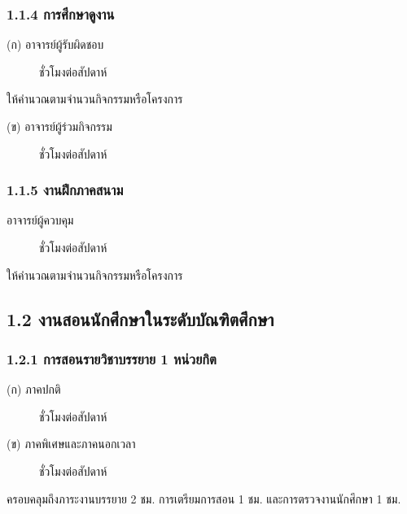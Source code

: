 \documentclass[a4paper,12pt,english]{sphinxmanual}
\begin{document}
\subsubsection{1.1.4 การศึกษาดูงาน}
\label{\detokenize{workload_rubric:id7}}\begin{description}
\item[{(ก) อาจารย์ผู้รับผิดชอบ}]  ชั่วโมงต่อสัปดาห์

\end{description}

ให้คำนวณตามจำนวนกิจกรรมหรือโครงการ
\begin{description}
\item[{(ข) อาจารย์ผู้ร่วมกิจกรรม}]  ชั่วโมงต่อสัปดาห์

\end{description}


\subsubsection{1.1.5 งานฝึกภาคสนาม}
\label{\detokenize{workload_rubric:id8}}\begin{description}
\item[{อาจารย์ผู้ควบคุม}]  ชั่วโมงต่อสัปดาห์

\end{description}

ให้คำนวณตามจำนวนกิจกรรมหรือโครงการ


\subsection{1.2 งานสอนนักศึกษาในระดับบัณฑิตศึกษา}
\label{\detokenize{workload_rubric:id9}}

\subsubsection{1.2.1 การสอนรายวิชาบรรยาย 1 หน่วยกิต}
\label{\detokenize{workload_rubric:id10}}\begin{description}
\item[{(ก) ภาคปกติ}]  ชั่วโมงต่อสัปดาห์

\item[{(ข) ภาคพิเศษและภาคนอกเวลา}]  ชั่วโมงต่อสัปดาห์

\end{description}

ครอบคลุมถึงภาระงานบรรยาย 2 ชม. การเตรียมการสอน 1 ชม. และการตรวจงานนักศึกษา 1 ชม.
\end{document}
